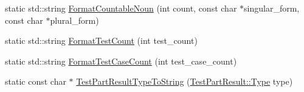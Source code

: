 \begin{DoxyCompactItemize}
\item 
static std\+::string \hyperlink{namespacetesting_a33e070c3e994cb75f9017fa2a044d536}{Format\+Countable\+Noun} (int count, const char $\ast$singular\+\_\+form, const char $\ast$plural\+\_\+form)
\item 
static std\+::string \hyperlink{namespacetesting_a7420a0eb48a02ba210e265afb75febdf}{Format\+Test\+Count} (int test\+\_\+count)
\item 
static std\+::string \hyperlink{namespacetesting_ab8cabb45f3d8c52d336372c1b62d75c5}{Format\+Test\+Case\+Count} (int test\+\_\+case\+\_\+count)
\item 
static const char $\ast$ \hyperlink{namespacetesting_a4e9fdeef31f7e49afccfde0532f76864}{Test\+Part\+Result\+Type\+To\+String} (\hyperlink{classtesting_1_1TestPartResult_a65ae656b33fdfdfffaf34858778a52d5}{Test\+Part\+Result\+::\+Type} type)
\end{DoxyCompactItemize}
